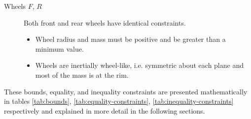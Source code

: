 \documentclass{bmd2019p}
\begin{document}
\begin{description}
  \item[Wheels $F$, $R$] Both front and rear wheels have identical constraints.
    \begin{itemize}
      \item Wheel radius and mass must be positive and be greater than a
        minimum value.
      \item Wheels are inertially wheel-like, i.e. symmetric about each plane
        and most of the mass is at the rim.
    \end{itemize}

\end{description}

These bounds, equality, and inequality constraints are presented mathematically
in tables \ref{tab:bounds}, \ref{tab:equality-constraints},
\ref{tab:inequality-constraints} respectively and explained in more detail in
the following sections.
%
\end{document}
